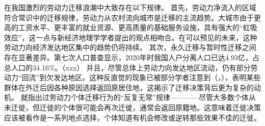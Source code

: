 \documentclass[a4paper, zihao=-4, fontset = mac, oneside]{ctexbook} %
\begin{document}
在我国激烈的劳动力迁移浪潮中大致存在以下规律。
首先，劳动力净流入的区域符合常识中的迁移规律，劳动力从农村流向城市是迁移的主流趋势。大城市由于更高的工资水平、更丰富的就业资源、更高质量的基础服务设施，具有强大的“虹吸效应”，这一点与新经济地理学学者提出的观点相吻合。在可以预见的未来，这种劳动力向经济发达地区集中的趋势仍将持续。
其次，永久迁移与暂时性迁移之间存在显著差异。第七次人口普查显示，2020年时我国人户分离人口已达4.93亿，占总人口的34.16\%。（xxx）
并且，尽管总体上劳动力向发达地区流动，仍有部分劳动力“回流”到欠发达地区。这种反直觉的现象已被部分学者注意到（\textcite{ShiZhiLeiJiaTingBingFuJiaTingJueCeYuNongCunQianYiLaoDongLiHuiLiu2012}，\textcite{RenYuanNongCunWaiChuLaoDongLiHuiLiuQianYiDeYingXiangYinSuHeHuiLiuXiaoYing2017}），表明某些群体在外迁后因各种原因选择返回原居住地，这揭示了迁移决策背后更为复杂的动机。
\textcite{davanzoRepeatMigrationUnited1983}就指出过劳动力个体迁移行为的“反复无常”规律————尽管大多数个体从未迁徙，但迁徙的个体很可能会再次迁徙，通常会返回原籍地。这意味着迁徙决策应该被看作是一系列地点选择，个体知道有机会修改或逆转那些效果不佳的迁徙。
\end{document}
